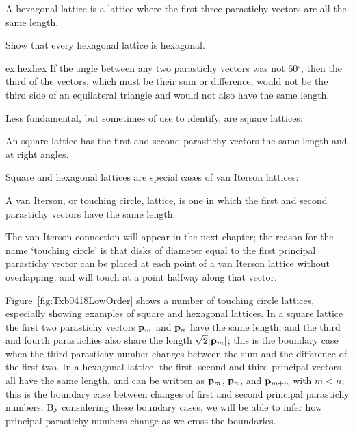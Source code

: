 \begin{definition}
	A hexagonal lattice is a lattice where the first three parastichy vectors are all the same length. 
\end{definition}
\begin{jExercise}\label{ex:hexhex}
	Show that every hexagonal lattice is hexagonal.
\end{jExercise}
\begin{jAnswer}{ex:hexhex}
	If the angle between any two parastichy vectors was not 60$^\circ$, then the third of the vectors, which must be their sum or difference, would not be the third side of an equilateral triangle and would not also have the same length.
\end{jAnswer}
Less fundamental, but sometimes of use to identify, are square lattices:
\begin{definition}
	An square lattice has the first and second parastichy vectors the same length and at right angles. 
\end{definition}
Square and hexagonal lattices are special cases of van Iterson lattices:
\begin{definition}
	A van Iterson, or touching circle, lattice, is one in which the first and second parastichy vectors have the same length.
\end{definition}

The van Iterson connection will appear in the next chapter; the reason for the name `touching circle' is that disks of diameter equal to the first principal parastichy vector can be placed at each point of a van Iterson lattice without overlapping, and will touch at a point halfway along that vector. 


Figure~\ref{fig:Txb0418LowOrder} shows a number of touching circle lattices, especially showing examples of square and hexagonal lattices. 
%
In a square lattice the first two parastichy vectors ${\mathbf p}_{m}$ and ${\mathbf p}_{n}$ have the same length, and the third and fourth parastichies also share the length $\sqrt{2}|{\mathbf p}_{m}|$; this is the boundary case when the third parastichy number changes between the sum and the difference of the first two. In a hexagonal lattice, the  first,  second and third principal  vectors all have the same length, and can be written as ${\mathbf p}_{m}$, ${\mathbf p}_{n}$, and ${\mathbf p}_{m+n}$ with $m<n$; this is the boundary case between changes of first and second principal parastichy numbers. 
By considering these boundary cases, we will be able to  infer how principal parastichy numbers change as we cross the boundaries.  



